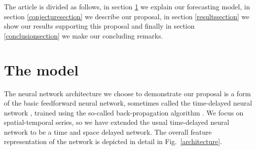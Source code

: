 \documentclass[journal]{IEEEtran}
\begin{document}
The article is divided as follows, in section \ref{modelsection} we explain our forecasting model, in section \ref{conjecturesection} 
we describe our proposal, in section \ref{resultssection} we show our results supporting this proposal and finally in section
\ref{conclusionsection} we make our concluding remarks.

\section{The model}
\label{modelsection}

The neural network architecture we choose to demonstrate our proposal is a form of the basic feedforward neural network,
sometimes called the time-delayed neural network \cite{Waibel:1990:PRU:108235.108263}, trained using the so-called back-propagation
algorithm \cite{10.1007/BFb0006203, 1986Natur.323..533R, 58337, Lecun98gradient-basedlearning}. 
We focus on spatial-temporal series, so we have extended the usual time-delayed neural network
to be a time and space delayed network. The overall feature representation of the network is depicted in detail in Fig.\ 
\ref{architecture}.
\end{document}
